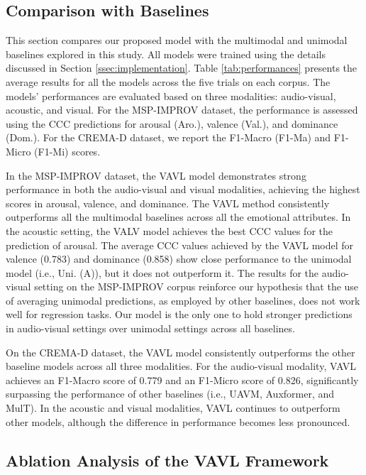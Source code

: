 \documentclass{article}
\begin{document}
\subsection{Comparison with Baselines}

This section compares our proposed model with the multimodal and unimodal baselines explored in this study. All models were trained using the details discussed in Section \ref{ssec:implementation}. Table \ref{tab:performances} presents the average results for all the models across the five trials on each corpus. The models' performances are evaluated based on three modalities: audio-visual, acoustic, and visual. For the MSP-IMPROV dataset, the performance is assessed using the CCC predictions for arousal (Aro.), valence (Val.), and dominance (Dom.). For the CREMA-D dataset, we report the F1-Macro (F1-Ma) and F1-Micro (F1-Mi) scores.

In the MSP-IMPROV dataset, the VAVL model demonstrates strong performance in both the audio-visual and visual modalities, achieving the highest scores in arousal, valence, and dominance. The VAVL method consistently outperforms all the multimodal baselines across all the emotional attributes. In the acoustic setting, the VALV model achieves the best CCC values for the prediction of arousal. The average CCC values achieved by the VAVL model for valence (0.783) and dominance (0.858) show close performance to the unimodal model (i.e., Uni. (A)), but it does not outperform it. The results for the audio-visual setting on the MSP-IMPROV corpus reinforce our hypothesis that the use of averaging unimodal predictions, as employed by other baselines, does not work well for regression tasks. Our model is the only one to hold stronger predictions in audio-visual settings over unimodal settings across all baselines.

On the CREMA-D dataset, the VAVL model consistently outperforms the other baseline models across all three modalities. For the audio-visual modality, VAVL achieves an F1-Macro score of 0.779 and an F1-Micro score of 0.826, significantly surpassing the performance of other baselines (i.e., UAVM, Auxformer, and MulT). In the acoustic and visual modalities, VAVL continues to outperform other models, although the difference in performance becomes less pronounced.



\subsection{Ablation Analysis of the VAVL Framework}
\label{ssec:ablations}
\end{document}
